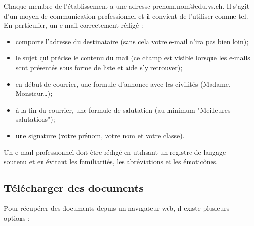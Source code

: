 \documentclass[10pt,a4paper]{report}
\begin{document}
Chaque membre de l'établissement a une adresse prenom.nom@edu.vs.ch. Il s'agit d'un moyen de communication professionnel et il convient de l'utiliser comme tel. En particulier, un e-mail correctement rédigé :
\begin{itemize}
	\item comporte l'adresse du destinataire (sans cela votre e-mail n'ira pas bien loin);
	\item le sujet qui précise le contenu du mail (ce champ est visible lorsque les e-mails sont présentés sous forme de liste et aide s'y retrouver);
	\item en début de courrier, une formule d'annonce avec les civilités (Madame, Monsieur\dots);
	\item à la fin du courrier, une formule de salutation (au minimum "Meilleures salutations");
	\item une signature (votre prénom, votre nom et votre classe).
\end{itemize}

Un e-mail professionnel doit être rédigé en utilisant un registre de langage soutenu et en évitant les familiarités, les abréviations et les émoticônes.



\subsection{Télécharger des documents}

Pour récupérer des documents depuis un navigateur web, il existe plusieurs options :
\end{document}
